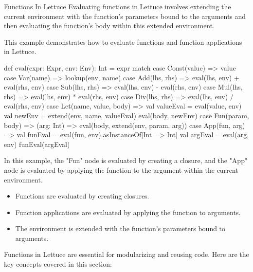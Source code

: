 \begin{notes}{Functions In Lettuce}
    Evaluating functions in Lettuce involves extending the current environment with the function's parameters bound to the arguments and then evaluating the function's body within this extended environment.
    
    \begin{highlight}
    
        This example demonstrates how to evaluate functions and function applications in Lettuce.
    
    \begin{code}[Scala]
    def eval(expr: Expr, env: Env): Int = expr match {
        case Const(value) => value
        case Var(name) => lookup(env, name)
        case Add(lhs, rhs) => eval(lhs, env) + eval(rhs, env)
        case Sub(lhs, rhs) => eval(lhs, env) - eval(rhs, env)
        case Mul(lhs, rhs) => eval(lhs, env) * eval(rhs, env)
        case Div(lhs, rhs) => eval(lhs, env) / eval(rhs, env)
        case Let(name, value, body) => 
            val valueEval = eval(value, env)
            val newEnv = extend(env, name, valueEval)
            eval(body, newEnv)
        case Fun(param, body) => 
            (arg: Int) => eval(body, extend(env, param, arg))
        case App(fun, arg) => 
            val funEval = eval(fun, env).asInstanceOf[Int => Int]
            val argEval = eval(arg, env)
            funEval(argEval)
    }
    \end{code}
    
        In this example, the "Fun" node is evaluated by creating a closure, and the "App" node is evaluated by applying the function to the argument within the current environment.
    
        \begin{itemize}
            \item Functions are evaluated by creating closures.
            \item Function applications are evaluated by applying the function to arguments.
            \item The environment is extended with the function's parameters bound to arguments.
        \end{itemize}
    
    \end{highlight}
    
    \begin{highlight}
    
        Functions in Lettuce are essential for modularizing and reusing code. Here are the key concepts covered in this section:
    

\end{highlight}
\end{notes}

